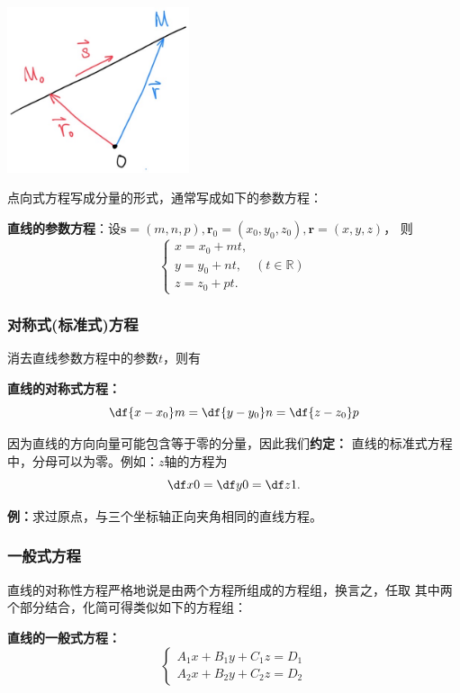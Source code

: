 \begin{center}
	\includegraphics[width=0.4\textwidth]{./images/ch8/lsr.jpg}
\end{center}

点向式方程写成分量的形式，通常写成如下的参数方程：

\begin{thx}
	{\bf 直线的参数方程}：设$\bm{s}=(m,n,p),\bm{r}_0=(x_0,y_0,z_0),
	\bm{r}=(x,y,z)$， 则
	$$
		{\left\{\begin{array}{l}
			x=x_0+mt,\\
			y=y_0+nt,\quad (t\in\mathbb{R})\\
			z=z_0+pt.
		\end{array}\right.}
	$$
\end{thx}

\subsubsection{对称式(标准式)方程}

消去直线参数方程中的参数$t$，则有

\begin{thx}
	{\bf 直线的对称式方程：}
	$$\df{x-x_0}m=\df{y-y_0}n=\df{z-z_0}p$$
\end{thx}

因为直线的方向向量可能包含等于零的分量，因此我们{\bf 约定：}
{\kaishu 直线的标准式方程中，分母可以为零}。例如：$z$轴的方程为
$$\df x0=\df y0=\df z1.$$

{\bf 例：}求过原点，与三个坐标轴正向夹角相同的直线方程。

\subsubsection{一般式方程}

直线的对称性方程严格地说是由两个方程所组成的方程组，换言之，任取
其中两个部分结合，化简可得类似如下的方程组：
\begin{thx}
	{\bf 直线的一般式方程：}
	$$
		\left\{\begin{array}{l}
			A_1x+B_1y+C_1z=D_1\\
			A_2x+B_2y+C_2z=D_2
		\end{array}\right.
	$$
\end{thx}

